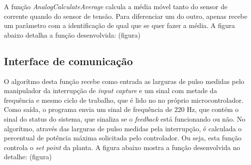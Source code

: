 A função \textit{AnalogCalculateAverage} calcula a média móvel tanto do sensor de corrente quando do sensor de tensão. Para diferenciar um do outro, apenas recebe um parâmetro com a identificação de qual que se quer fazer a média. A figura abaixo detalha a função desenvolvida:
(figura)


\subsection{Interface de comunicação}
O algorítmo desta função recebe como entrada as larguras de pulso medidas pelo manipulador da interrupção de \textit{input capture} e um sinal com metade da frequência e mesmo ciclo de trabalho, que é lido no no próprio microcontrolador. Como saída, o programa envia um sinal de frequência de 220 Hz, que contém o sinal do status do sistema, que sinaliza se o \textit{feedback} está funcionando ou não. No algorítmo, através das larguras de pulso medidas pela interrupção, é calculada o percentual de potência máxima solicitada pelo controlador. Ou seja, esta função controla o \textit{set point} da planta. A figura abaixo mostra a função desenvolvida no detalhe:
(figura)